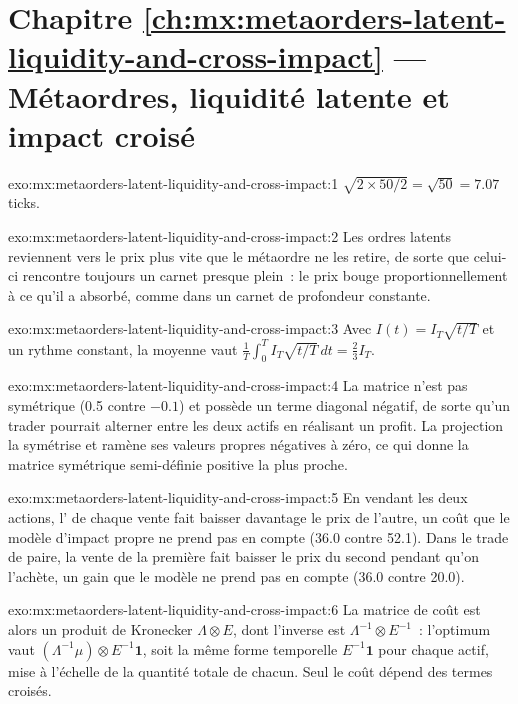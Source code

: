 \section*{Chapitre \ref{ch:mx:metaorders-latent-liquidity-and-cross-impact} --- Métaordres, liquidité latente et impact croisé}

\begin{solution}{exo:mx:metaorders-latent-liquidity-and-cross-impact:1}
$\sqrt{2\times50/2}=\sqrt{50}=7.07$ ticks.
\end{solution}

\begin{solution}{exo:mx:metaorders-latent-liquidity-and-cross-impact:2}
Les ordres latents reviennent vers le prix plus vite que le métaordre ne les retire, de sorte que celui-ci rencontre toujours un carnet presque plein~: le prix bouge
proportionnellement à ce qu'il a absorbé, comme dans un carnet de profondeur constante.
\end{solution}

\begin{solution}{exo:mx:metaorders-latent-liquidity-and-cross-impact:3}
Avec $I(t)=I_T\sqrt{t/T}$ et un rythme constant, la moyenne vaut $\frac1T\int_0^TI_T\sqrt{t/T}\,dt=\tfrac23I_T$.
\end{solution}

\begin{solution}{exo:mx:metaorders-latent-liquidity-and-cross-impact:4}
La matrice n'est pas symétrique (0.5 contre $-0.1$) et possède un terme diagonal négatif, de sorte qu'un trader pourrait alterner entre les deux actifs en réalisant un profit. La projection
la symétrise et ramène ses valeurs propres négatives à zéro, ce qui donne la matrice symétrique semi-définie positive la plus proche.
\end{solution}

\begin{solution}{exo:mx:metaorders-latent-liquidity-and-cross-impact:5}
En vendant les deux actions, l' de chaque vente fait baisser davantage le prix de l'autre, un coût que le modèle d'impact propre ne prend pas en compte (36.0 contre 52.1). Dans le trade de paire,
la vente de la première fait baisser le prix du second pendant qu'on l'achète, un gain que le modèle ne prend pas en compte (36.0 contre 20.0).
\end{solution}

\begin{solution}{exo:mx:metaorders-latent-liquidity-and-cross-impact:6}
La matrice de coût est alors un produit de Kronecker $\Lambda\otimes E$, dont l'inverse est $\Lambda^{-1}\otimes E^{-1}$~: l'optimum vaut $(\Lambda^{-1}\mu)\otimes
E^{-1}\mathbf 1$, soit la même forme temporelle $E^{-1}\mathbf 1$ pour chaque actif, mise à l'échelle de la quantité totale de chacun. Seul le coût dépend des termes croisés.
\end{solution}

